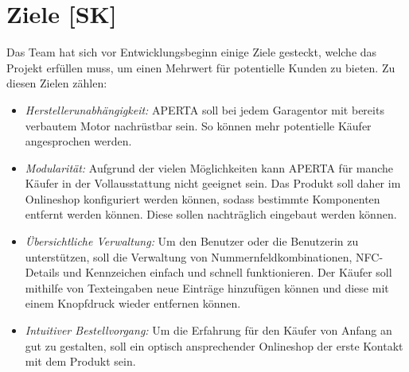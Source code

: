 \section{Ziele [SK]}
Das Team hat sich vor Entwicklungsbeginn einige Ziele gesteckt, welche das Projekt erfüllen muss, um einen Mehrwert für potentielle Kunden zu bieten. Zu diesen Zielen zählen:
\begin{itemize}
    \item \textit{Herstellerunabhängigkeit:} APERTA soll bei jedem Garagentor mit bereits verbautem Motor nachrüstbar sein. So können mehr potentielle Käufer angesprochen werden.
    \item \textit{Modularität:} Aufgrund der vielen Möglichkeiten kann APERTA für manche Käufer in der Vollausstattung nicht geeignet sein. Das Produkt soll daher im Onlineshop konfiguriert werden können, sodass bestimmte Komponenten entfernt werden können. Diese sollen nachträglich eingebaut werden können.
    \item \textit{Übersichtliche Verwaltung:} Um den Benutzer oder die Benutzerin zu unterstützen, soll die Verwaltung von Nummernfeldkombinationen, NFC-Details und Kennzeichen einfach und schnell funktionieren. Der Käufer soll mithilfe von Texteingaben neue Einträge hinzufügen können und diese mit einem Knopfdruck wieder entfernen können.
    \item \textit{Intuitiver Bestellvorgang:}
    Um die Erfahrung für den Käufer von Anfang an gut zu gestalten, soll ein optisch ansprechender Onlineshop der erste Kontakt mit dem Produkt sein.
  \end{itemize}